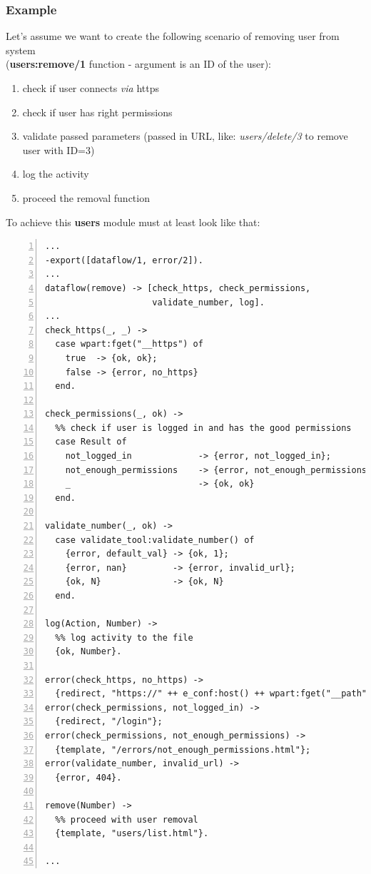 \subsubsection{Example}Let's assume we want to create the following scenario of removing user from system \\({\bf users:remove/1} function - argument is an ID of the user):
\begin{enumerate}
\item check if user connects {\it via} https
\item check if user has right permissions
\item validate passed parameters (passed in URL, like: {\it users/delete/3} to remove user with ID=3)
\item log the activity
\item proceed the removal function
\end{enumerate}
To achieve this {\bf users} module must at least look like that:
\begin{Verbatim}[numbers=left]
...
-export([dataflow/1, error/2]).
...
dataflow(remove) -> [check_https, check_permissions, 
                     validate_number, log].
...
check_https(_, _) ->
  case wpart:fget("__https") of
    true  -> {ok, ok};
    false -> {error, no_https}
  end.

check_permissions(_, ok) ->
  %% check if user is logged in and has the good permissions
  case Result of
    not_logged_in             -> {error, not_logged_in};
    not_enough_permissions    -> {error, not_enough_permissions};
    _                         -> {ok, ok}
  end.

validate_number(_, ok) ->
  case validate_tool:validate_number() of
    {error, default_val} -> {ok, 1};
    {error, nan}         -> {error, invalid_url};
    {ok, N}              -> {ok, N}
  end.

log(Action, Number) ->
  %% log activity to the file
  {ok, Number}.

error(check_https, no_https) ->
  {redirect, "https://" ++ e_conf:host() ++ wpart:fget("__path")};
error(check_permissions, not_logged_in) ->
  {redirect, "/login"};
error(check_permissions, not_enough_permissions) ->
  {template, "/errors/not_enough_permissions.html"};
error(validate_number, invalid_url) ->
  {error, 404}.

remove(Number) ->
  %% proceed with user removal
  {template, "users/list.html"}.

...
\end{Verbatim}
